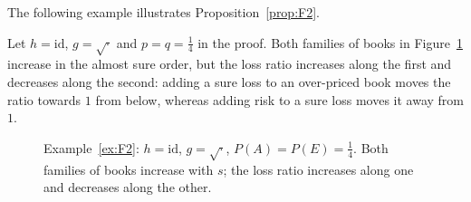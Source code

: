 The following example illustrates Proposition~\ref{prop:F2}.

\begin{example}\label{ex:F2}
Let $h=\mathrm{id}$, $g=\sqrt{\cdot}$ and $p=q=\tfrac14$ in the proof. Both families of books in
Figure~\ref{fig:F2} increase in the almost sure order, but the loss ratio increases along the first and
decreases along the second: adding a sure loss to an over-priced book moves the ratio towards $1$ from below,
whereas adding risk to a sure loss moves it away from $1$.
\end{example}

\begin{figure}[ht]
\centering
{}
\caption{Example~\ref{ex:F2}: $h=\mathrm{id}$, $g=\sqrt{\cdot}$, $P(A)=P(E)=\frac14$. Both families of books
increase with $s$; the loss ratio increases along one and decreases along the other.}\label{fig:F2}
\end{figure}
